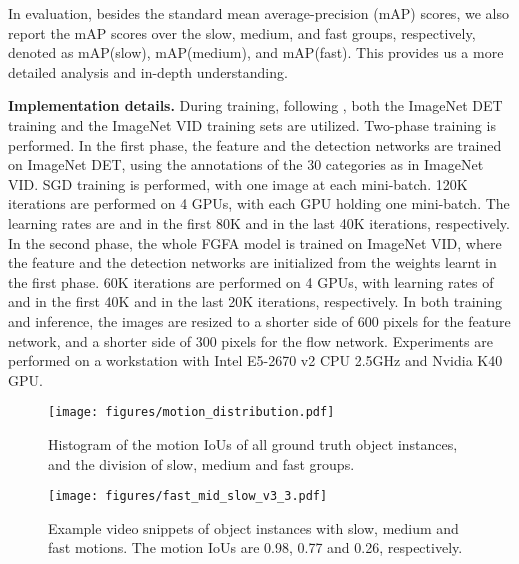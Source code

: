 \documentclass[10pt,twocolumn,letterpaper]{article}
\begin{document}
In evaluation, besides the standard mean average-precision (mAP) scores, we also report the mAP scores over the slow, medium, and fast groups, respectively, denoted as mAP(slow), mAP(medium), and mAP(fast). This provides us a more detailed analysis and in-depth understanding.

\textbf{Implementation details.} During training, following \cite{kang2016tcnn,lee2016multi}, both the ImageNet DET training and the ImageNet VID training sets are utilized. Two-phase training is performed. In the first phase, the feature and the detection networks are trained on ImageNet DET,  using the annotations of the 30 categories as in ImageNet VID. SGD training is performed, with one image at each mini-batch. 120K iterations are performed on 4 GPUs, with each GPU holding one mini-batch. The learning rates are  and  in the first 80K and in the last 40K iterations, respectively. In the second phase, the whole FGFA model is trained on ImageNet VID, where the feature and the detection networks are initialized from the weights learnt in the first phase. 60K iterations are performed on 4 GPUs, with learning rates of   and  in the first 40K and in the last 20K iterations, respectively. In both training and inference, the images are resized to a shorter side of 600 pixels for the feature network, and a shorter side of 300 pixels for the flow network. Experiments are performed on a workstation with Intel E5-2670 v2 CPU 2.5GHz and Nvidia K40 GPU.

\begin{figure}
\begin{center}
\texttt{[image: figures/motion\_distribution.pdf]}
\end{center}
\caption{Histogram of the motion IoUs of all ground truth object instances, and the division of slow, medium and fast groups.}
\label{fig.motion_distribution}
\end{figure}

\begin{figure}
\begin{center}
\texttt{[image: figures/fast\_mid\_slow\_v3\_3.pdf]}
\end{center}
\caption{Example video snippets of object instances with slow, medium and fast motions. The motion IoUs are 0.98, 0.77 and 0.26, respectively.}
\label{fig.fast_mid_slow}\vspace{-0.5em}
\end{figure}
\end{document}
